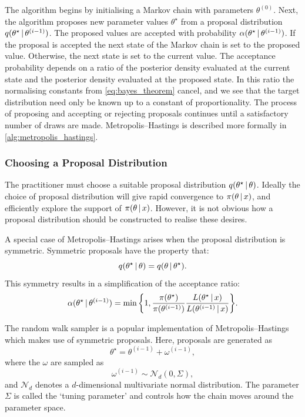 The algorithm begins by initialising a Markov chain with parameters
$\theta^{(0)}$. Next, the algorithm proposes new parameter values
$\theta^\star$ from a proposal distribution $q(\theta^\star \,|\,
\theta^{(i-1)})$. The proposed values are accepted with probability
$\alpha(\theta^\star \,|\, \theta^{(i-1)})$. If the proposal is accepted the
next state of the Markov chain is set to the proposed value. Otherwise, the
next state is set to the current value. The acceptance probability depends on a
ratio of the posterior density evaluated at the current state and the posterior
density evaluated at the proposed state. In this ratio the normalising
constants from \cref{eq:bayes_theorem} cancel, and we see that the target
distribution need only be known up to a constant of proportionality. The
process of proposing and accepting or rejecting proposals continues until a
satisfactory number of draws are made. Metropolis--Hastings is described more
formally in \cref{alg:metropolis_hastings}.

\subsubsection{Choosing a Proposal Distribution}
\label{ssec:proposal_distribution}

The practitioner must choose a suitable proposal distribution $q(\theta^\star
\,|\, \theta)$. Ideally the choice of proposal distribution will give rapid
convergence to $\pi(\theta \,|\, x)$, and efficiently explore the support of
$\pi(\theta \,|\, x)$. However, it is not obvious how a proposal distribution
should be constructed to realise these desires.

A special case of Metropolis--Hastings arises when the proposal distribution is
symmetric. Symmetric proposals have the property that:
\begin{equation*}
  q(\theta^\star \,|\, \theta) = q(\theta \,|\, \theta^\star).
\end{equation*}
This symmetry results in a simplification of the acceptance ratio:
\begin{equation*}
  \alpha({\theta}^\star \given \theta^{(i-1)})
    = \text{min}\,\bigg\{1,
                        \frac{\pi(\theta^\star)}{\pi(\theta^{(i-1)})}%
                        \frac{L(\theta^\star \given  x)}%
                        {L(\theta^{(i-1)} \given  x)}
                  \bigg\}.
\end{equation*}

The random walk sampler is a popular implementation of Metropolis--Hastings
which makes use of symmetric proposals. Here, proposals are generated as
\begin{equation*}
  \theta^\star = \theta^{(i-1)} +  \omega^{(i-1)},
\end{equation*}
where the $\omega$ are sampled as
\begin{equation*}
   \omega^{(i-1)} \sim \mathcal{N}_d(0, \Sigma),
\end{equation*}
and $\mathcal{N}_d$ denotes a $d$-dimensional multivariate normal distribution.
The parameter $\Sigma$ is called the `tuning parameter' and controls how the
chain moves around the parameter space.

